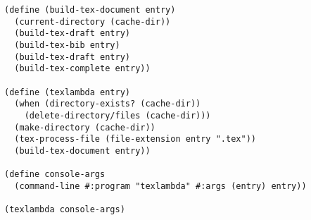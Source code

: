 \begin{lstlisting}[language=racket]
(define (build-tex-document entry)
  (current-directory (cache-dir))
  (build-tex-draft entry)
  (build-tex-bib entry)
  (build-tex-draft entry)
  (build-tex-complete entry))

(define (texlambda entry)
  (when (directory-exists? (cache-dir))
    (delete-directory/files (cache-dir)))
  (make-directory (cache-dir))
  (tex-process-file (file-extension entry ".tex"))
  (build-tex-document entry))

(define console-args
  (command-line #:program "texlambda" #:args (entry) entry))

(texlambda console-args)
\end{lstlisting}


